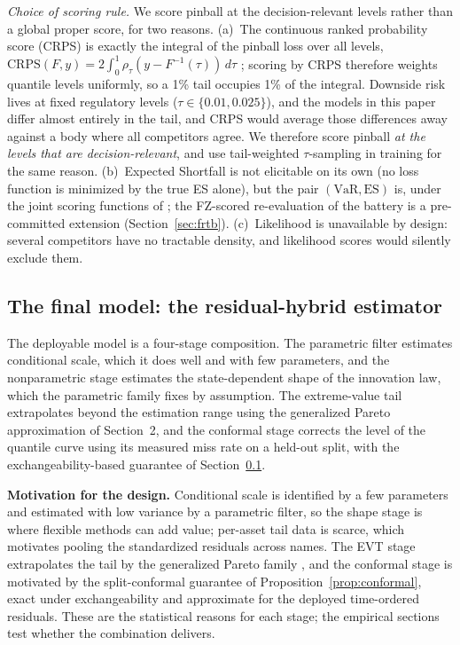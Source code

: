 \documentclass[11pt]{article}
\newcommand{\VaR}{\mathrm{VaR}}
\newcommand{\ES}{\mathrm{ES}}
\theoremstyle{remark}
\begin{document}
\emph{Choice of scoring rule.} We score pinball at the
decision-relevant levels rather than a global proper score, for two
reasons. (a)~The continuous ranked probability
score (CRPS) is exactly the integral of the pinball loss over all
levels, $\mathrm{CRPS}(F,y) = 2\int_0^1 \rho_\tau(y - F^{-1}(\tau))\,
d\tau$ \citep{gneitingraftery2007}; scoring by CRPS therefore weights
quantile levels uniformly, so a 1\% tail occupies 1\% of the
integral. Downside
risk lives at fixed regulatory levels ($\tau \in \{0.01, 0.025\}$), and
the models in this paper differ almost entirely in the tail, and CRPS
would average those differences away against a body where all
competitors agree. We therefore score pinball \emph{at the levels that
are decision-relevant}, and use tail-weighted $\tau$-sampling in
training for the same reason. (b)~Expected Shortfall is not elicitable
on its own (no loss function is minimized by the true ES alone), but
the pair $(\VaR,\ES)$ is, under the joint scoring functions of
\citet{fissler2016}; the FZ-scored re-evaluation of the battery is a
pre-committed extension (Section~\ref{sec:frtb}). (c)~Likelihood is
unavailable by design: several competitors have no tractable density, and likelihood scores
would silently exclude them.

\subsection{The final model: the residual-hybrid estimator}\label{sec:hybrid}

The deployable model is a four-stage composition. The parametric
filter estimates conditional scale, which it does well and with few
parameters, and the nonparametric stage estimates the state-dependent
shape of the innovation law, which the parametric family fixes by
assumption. The extreme-value tail extrapolates beyond the estimation
range using the generalized Pareto approximation of Section~2, and the
conformal stage corrects the level of the quantile curve using its
measured miss rate on a held-out split, with the exchangeability-based
guarantee of Section~\ref{sec:hybrid}.

\noindent\textbf{Motivation for the design.} Conditional scale is
identified by a few parameters and estimated with low variance by a
parametric filter, so the shape stage is where flexible methods can
add value; per-asset tail data is scarce, which motivates pooling the
standardized residuals across names. The EVT stage extrapolates the
tail by the generalized Pareto family \citep{balkema1974,
pickands1975}, and the conformal stage is motivated by the
split-conformal guarantee of Proposition~\ref{prop:conformal}, exact
under exchangeability and approximate for the deployed time-ordered
residuals. These are the
statistical reasons for each stage; the empirical sections test
whether the combination delivers.
\end{document}
